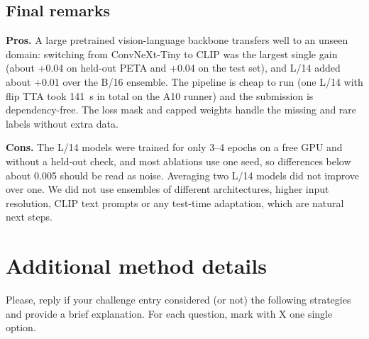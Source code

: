 \documentclass[a4paper, 10pt, conference]{ieeeconf}
\begin{document}
\subsection{Final remarks}
\textbf{Pros.} A large pretrained vision-language backbone transfers well to an unseen domain: switching from ConvNeXt-Tiny to CLIP was the largest single gain (about +0.04 on held-out PETA and +0.04 on the test set), and L/14 added about +0.01 over the B/16 ensemble. The pipeline is cheap to run (one L/14 with flip TTA took 141~s in total on the A10 runner) and the submission is dependency-free. The loss mask and capped weights handle the missing and rare labels without extra data.

\textbf{Cons.} The L/14 models were trained for only 3--4 epochs on a free GPU and without a held-out check, and most ablations use one seed, so differences below about 0.005 should be read as noise. Averaging two L/14 models did not improve over one. We did not use ensembles of different architectures, higher input resolution, CLIP text prompts or any test-time adaptation, which are natural next steps.


\section{Additional method details}
Please, reply if your challenge entry considered (or not) the following strategies and provide a brief explanation. For each question, mark with X one single option. \\
\end{document}
